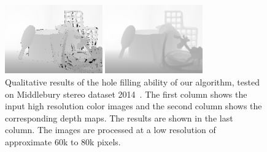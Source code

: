 \begin{figure}[htb]
\begin{minipage}[b]{0.3\linewidth}
\end{minipage}
%
\hfill
\begin{minipage}[b]{0.3\linewidth}
  \centering
  \centerline{\includegraphics[width=4.2cm]{depth_interp/quali_rst/n_hf_Cable-perfect.png}}
\end{minipage}
\hfill
\begin{minipage}[b]{0.3\linewidth}
  \centering
  \centerline{\includegraphics[width=4.2cm]{depth_interp/quali_rst/hf_Cable-perfect.png}}
\end{minipage}
\vspace*{-0.10in}
\caption{Qualitative results of the hole filling ability of our algorithm, tested on Middlebury stereo dataset 2014~\cite{scharstein2014high}. The first column shows the input high resolution color images and the second column shows the corresponding depth maps. The results are shown in the last column. The images are processed at a low resolution of approximate 60k to 80k pixels.}
\label{fig:quali_rst}
\end{figure}
